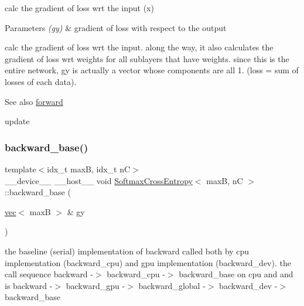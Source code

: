 calc the gradient of loss wrt the input (x) 


\begin{DoxyParams}{Parameters}
{\em (gy)} & gradient of loss with respect to the output\\
\hline
\end{DoxyParams}
calc the gradient of loss wrt the input. along the way, it also calculates the gradient of loss wrt weights for all sublayers that have weights. since this is the entire network, gy is actually a vector whose components are all 1. (loss = sum of losses of each data). \begin{DoxySeeAlso}{See also}
\hyperlink{structSoftmaxCrossEntropy_ad9123a2a40bac45237466faf0cff3fbc}{forward} 

update 
\end{DoxySeeAlso}
\mbox{\label{structSoftmaxCrossEntropy_a1cea37bcbeedb5749f56f740baa6ce92}} 
\subsubsection{\texorpdfstring{backward\+\_\+base()}{backward\_base()}}
{\footnotesize\ttfamily template$<$idx\+\_\+t maxB, idx\+\_\+t nC$>$ \\
\+\_\+\+\_\+device\+\_\+\+\_\+ \+\_\+\+\_\+host\+\_\+\+\_\+ void \hyperlink{structSoftmaxCrossEntropy}{Softmax\+Cross\+Entropy}$<$ maxB, nC $>$\+::backward\+\_\+base (\begin{DoxyParamCaption}\item[{\hyperlink{structvec}{vec}$<$ maxB $>$ \&}]{gy }\end{DoxyParamCaption})\hspace{0.3cm}{\ttfamily [inline]}}



the baseline (serial) implementation of backward called both by cpu implementation (backward\+\_\+cpu) and gpu implementation (backward\+\_\+dev). the call sequence backward -\/$>$ backward\+\_\+cpu -\/$>$ backward\+\_\+base on cpu and and is backward -\/$>$ backward\+\_\+gpu -\/$>$ backward\+\_\+global -\/$>$ backward\+\_\+dev -\/$>$ backward\+\_\+base 



